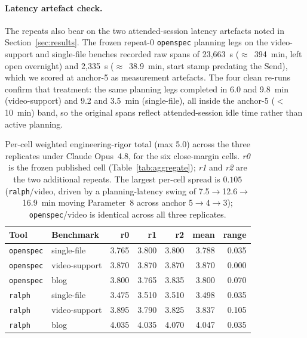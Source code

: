 \paragraph{Latency artefact check.}
The repeats also bear on the two attended-session latency artefacts noted in
Section~\ref{sec:results}. The frozen repeat-0 \texttt{openspec} planning legs on
the video-support and single-file benches recorded raw spans of 23,663~s
($\approx$~394~min, left open overnight) and 2,335~s ($\approx$~38.9~min, start
stamp predating the Send), which we scored at anchor-5 as measurement artefacts.
The four clean re-runs confirm that treatment: the same planning legs completed in
6.0 and 9.8~min (video-support) and 9.2 and 3.5~min (single-file), all inside the
anchor-5 ($<$10~min) band, so the original spans reflect attended-session idle
time rather than active planning.

\begin{table}[h]
\centering
\caption{Per-cell weighted engineering-rigor total (max 5.0) across the three
replicates under Claude Opus~4.8, for the six close-margin cells. \emph{r0} is
the frozen published cell (Table~\ref{tab:aggregate}); \emph{r1} and \emph{r2}
are the two additional repeats. The largest per-cell spread is $0.105$
(\texttt{ralph}/video, driven by a planning-latency swing of 7.5$\to$12.6$\to$16.9~min
moving Parameter~8 across anchor 5$\to$4$\to$3); \texttt{openspec}/video is
identical across all three replicates.}
\label{tab:variance-repeats}
\begin{tabular}{ll rrr rr}
\toprule
Tool & Benchmark & r0 & r1 & r2 & mean & range \\
\midrule
\texttt{openspec} & single-file   & 3.765 & 3.800 & 3.800 & 3.788 & 0.035 \\
\texttt{openspec} & video-support & 3.870 & 3.870 & 3.870 & 3.870 & 0.000 \\
\texttt{openspec} & blog          & 3.800 & 3.765 & 3.835 & 3.800 & 0.070 \\
\midrule
\texttt{ralph}    & single-file   & 3.475 & 3.510 & 3.510 & 3.498 & 0.035 \\
\texttt{ralph}    & video-support & 3.895 & 3.790 & 3.825 & 3.837 & 0.105 \\
\texttt{ralph}    & blog          & 4.035 & 4.035 & 4.070 & 4.047 & 0.035 \\
\bottomrule
\end{tabular}
\end{table}

